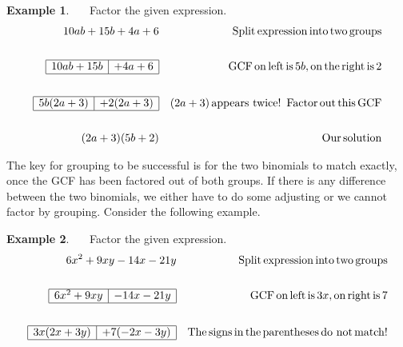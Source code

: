 \documentclass[12pt]{book}
\theoremstyle{definition}
\newtheorem{example}{Example}
\newcommand{\tmop}[1]{\ensuremath{\operatorname{#1}}}
\begin{document}
\begin{example}~~~Factor the given expression.
  \begin{eqnarray*}
    10 ab + 15 b + 4 a + 6 &  & \tmop{Split} \tmop{expression} \tmop{into}
    \tmop{two} \tmop{groups}\\
&&\\
    \begin{array}{|l|l|}
      \hline
      10 ab + 15 b & + 4 a + 6\\
      \hline
    \end{array} &  & \tmop{GCF} \tmop{on} \tmop{left} \tmop{is} 5 b, \tmop{on}
    \tmop{the} \tmop{right} \tmop{is} 2\\
&&\\
    \begin{array}{|l|l|}
      \hline
      5 b (2 a + 3) & + 2 (2 a + 3)\\
      \hline
    \end{array} &  & (2 a + 3) \tmop{appears~twice} !
    \tmop{~Factor} \tmop{out} \tmop{this} \tmop{GCF}\\
&&\\
    (2 a + 3) (5 b + 2) &  & \tmop{Our} \tmop{solution}
  \end{eqnarray*}
\end{example}

The key for grouping to be successful is for the two binomials to match exactly, once the GCF has been factored out of both groups. If there is any difference between the two binomials, we either have to do some adjusting or we cannot factor by grouping. Consider the following example.

\begin{example}~~~Factor the given expression.
  \begin{eqnarray*}
    6 x^2 + 9 x y - 14 x - 21 y &  & \tmop{Split} \tmop{expression} \tmop{into}
    \tmop{two} \tmop{groups}\\
&&\\
    \begin{array}{|l|l|}
      \hline
      6 x^2 + 9 x y & - 14 x - 21 y\\
      \hline
    \end{array} &  & \tmop{GCF} \tmop{on} \tmop{left} \tmop{is} 3 x, \tmop{on}
    \tmop{right} \tmop{is} 7\\
&&\\
    \begin{array}{|l|l|}
      \hline
      3 x (2 x + 3 y) & + 7 (- 2 x - 3 y)\\
      \hline
    \end{array} &  & \tmop{The} \tmop{signs} \tmop{in} \tmop{the}
    \tmop{parentheses} \tmop{do~not} \tmop{match} !
  \end{eqnarray*}
\end{example}
  
\end{document}
